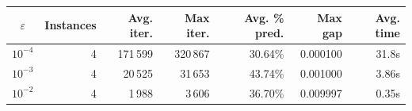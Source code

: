 \begin{tabular}{crrrrrr}
\toprule
$\varepsilon$ & Instances & Avg. iter. & Max iter. & Avg. \% pred. & Max gap & Avg. time \\
\midrule
$10^{-4}$ & 4 & 171\,599 & 320\,867 & 30.64\% & 0.000100 & 31.8s \\
$10^{-3}$ & 4 & 20\,525 & 31\,653 & 43.74\% & 0.001000 & 3.86s \\
$10^{-2}$ & 4 & 1\,988 & 3\,606 & 36.70\% & 0.009997 & 0.35s \\
\bottomrule
\end{tabular}